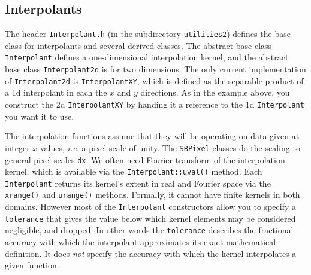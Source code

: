\documentclass[11pt,preprint,flushrt]{aastex}
\begin{document}
\subsection{Interpolants}
The header {\tt Interpolant.h} (in the subdirectory {\tt utilities2}) defines the base class for interpolants and several derived classes.  The abstract base class {\tt Interpolant} defines a one-dimensional interpolation kernel, and the abstract base class {\tt Interpolant2d} is for two dimensions.  The only current implementation of {\tt Interpolant2d} is {\tt InterpolantXY}, which is defined as the separable product of a 1d interpolant in each the $x$ and $y$ directions.  As in the example above, you construct the 2d {\tt InterpolantXY} by handing it a reference to the 1d {\tt Interpolant} you want it to use.

The interpolation functions assume that they will be operating on data given at integer $x$ values, {\it i.e.} a pixel scale of unity.  The {\tt SBPixel} classes do the scaling to general pixel scales {\tt dx}.  We often need Fourier transform of the interpolation kernel, which is available via the {\tt Interpolant::uval()} method.  Each {\tt Interpolant} returns its kernel's extent in real and Fourier space via the {\tt xrange()} and {\tt urange()} methods.  Formally, it cannot have finite kernels in both domains.  However most of the {\tt Interpolant} constructors allow you to specify a {\tt tolerance} that gives the value below which kernel elements may be considered negligible, and dropped.  In other words the {\tt tolerance} describes the fractional accuracy with which the interpolant approximates its exact mathematical definition.  It does {\em not} specify the accuracy with which the kernel interpolates a given function.
\end{document}
